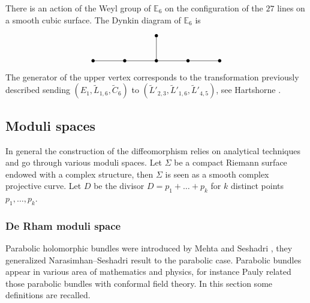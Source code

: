 \begin{remark}
There is an action of the Weyl group of $\mathbb{E}_6$ on the configuration of the $27$ lines on a smooth cubic surface. The Dynkin diagram of $\mathbb{E}_6$ is
\[\begin{tikzcd}[scale=.8]
	&& \bullet \\
	\bullet & \bullet & \bullet & \bullet & \bullet
	\arrow[no head, from=2-1, to=2-2, start anchor=center, end anchor = center ]
	\arrow[no head, from=2-3, to=2-4,start anchor=center, end anchor = center ]
	\arrow[no head, from=2-4, to=2-5,start anchor=center, end anchor = center ]
	\arrow[no head, from=1-3, to=2-3,start anchor=center, end anchor = center ]
	\arrow[no head, from=2-2, to=2-3,start anchor=center, end anchor = center ]
\end{tikzcd}
\]
The generator of the upper vertex corresponds to the transformation previously described sending $(E_1, \widetilde{L}_{1,6},\widetilde{C}_6) $ to $(\widetilde{L}'_{2,3},\widetilde{L}'_{1,6},\widetilde{L}'_{4,5})$, see Hartshorne \cite[V, Exer.\,4.11]{Hartshorne}.
\end{remark}

\subsection{Moduli spaces}\label{sect_moduli_spaces}

In general the construction of the diffeomorphism relies on analytical techniques and go through various moduli spaces. Let $\Sigma$ be a compact Riemann surface endowed with a complex structure, then $\Sigma$ is seen as a smooth complex projective curve. Let $D$ be the divisor $D=p_1+\dots +p_k$ for $k$ distinct points $p_1,\dots,p_k$.

\subsubsection{De Rham moduli space}\label{subsect_dR_alg}
Parabolic holomorphic bundles were introduced by Mehta and Seshadri \cite{Mehta_Seshadri}, they generalized Narasimhan--Seshadri \cite{Narasimhan_Seshadri} result to the parabolic case. Parabolic bundles appear in various area of mathematics and physics, for instance Pauly \cite{Pauly} related those parabolic bundles with conformal field theory. In this section some definitions are recalled.

